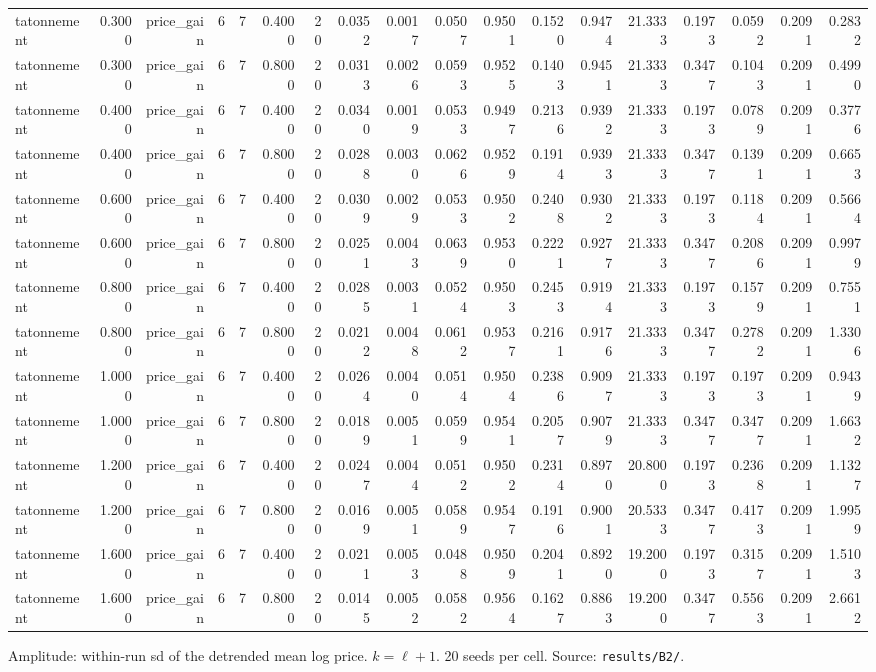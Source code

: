 \begin{table}[htbp]
\begin{tabular}{lrrrrrrrrrrrrrrrrr}
tatonnement & 0.3000 & price\_gain & 6 & 7 & 0.4000 & 20 & 0.0352 & 0.0017 & 0.0507 & 0.9501 & 0.1520 & 0.9474 & 21.3333 & 0.1973 & 0.0592 & 0.2091 & 0.2832 \\
tatonnement & 0.3000 & price\_gain & 6 & 7 & 0.8000 & 20 & 0.0313 & 0.0026 & 0.0593 & 0.9525 & 0.1403 & 0.9451 & 21.3333 & 0.3477 & 0.1043 & 0.2091 & 0.4990 \\
tatonnement & 0.4000 & price\_gain & 6 & 7 & 0.4000 & 20 & 0.0340 & 0.0019 & 0.0533 & 0.9497 & 0.2136 & 0.9392 & 21.3333 & 0.1973 & 0.0789 & 0.2091 & 0.3776 \\
tatonnement & 0.4000 & price\_gain & 6 & 7 & 0.8000 & 20 & 0.0288 & 0.0030 & 0.0626 & 0.9529 & 0.1914 & 0.9393 & 21.3333 & 0.3477 & 0.1391 & 0.2091 & 0.6653 \\
tatonnement & 0.6000 & price\_gain & 6 & 7 & 0.4000 & 20 & 0.0309 & 0.0029 & 0.0533 & 0.9502 & 0.2408 & 0.9302 & 21.3333 & 0.1973 & 0.1184 & 0.2091 & 0.5664 \\
tatonnement & 0.6000 & price\_gain & 6 & 7 & 0.8000 & 20 & 0.0251 & 0.0043 & 0.0639 & 0.9530 & 0.2221 & 0.9277 & 21.3333 & 0.3477 & 0.2086 & 0.2091 & 0.9979 \\
tatonnement & 0.8000 & price\_gain & 6 & 7 & 0.4000 & 20 & 0.0285 & 0.0031 & 0.0524 & 0.9503 & 0.2453 & 0.9194 & 21.3333 & 0.1973 & 0.1579 & 0.2091 & 0.7551 \\
tatonnement & 0.8000 & price\_gain & 6 & 7 & 0.8000 & 20 & 0.0212 & 0.0048 & 0.0612 & 0.9537 & 0.2161 & 0.9176 & 21.3333 & 0.3477 & 0.2782 & 0.2091 & 1.3306 \\
tatonnement & 1.0000 & price\_gain & 6 & 7 & 0.4000 & 20 & 0.0264 & 0.0040 & 0.0514 & 0.9504 & 0.2386 & 0.9097 & 21.3333 & 0.1973 & 0.1973 & 0.2091 & 0.9439 \\
tatonnement & 1.0000 & price\_gain & 6 & 7 & 0.8000 & 20 & 0.0189 & 0.0051 & 0.0599 & 0.9541 & 0.2057 & 0.9079 & 21.3333 & 0.3477 & 0.3477 & 0.2091 & 1.6632 \\
tatonnement & 1.2000 & price\_gain & 6 & 7 & 0.4000 & 20 & 0.0247 & 0.0044 & 0.0512 & 0.9502 & 0.2314 & 0.8970 & 20.8000 & 0.1973 & 0.2368 & 0.2091 & 1.1327 \\
tatonnement & 1.2000 & price\_gain & 6 & 7 & 0.8000 & 20 & 0.0169 & 0.0051 & 0.0589 & 0.9547 & 0.1916 & 0.9001 & 20.5333 & 0.3477 & 0.4173 & 0.2091 & 1.9959 \\
tatonnement & 1.6000 & price\_gain & 6 & 7 & 0.4000 & 20 & 0.0211 & 0.0053 & 0.0488 & 0.9509 & 0.2041 & 0.8920 & 19.2000 & 0.1973 & 0.3157 & 0.2091 & 1.5103 \\
tatonnement & 1.6000 & price\_gain & 6 & 7 & 0.8000 & 20 & 0.0145 & 0.0052 & 0.0582 & 0.9564 & 0.1627 & 0.8863 & 19.2000 & 0.3477 & 0.5563 & 0.2091 & 2.6612 \\
\bottomrule
\end{tabular}
\par\smallskip
\begin{minipage}{\linewidth}\footnotesize Amplitude: within-run sd of the detrended mean log price. $k=\ell+1$. 20 seeds per cell. Source: \texttt{results/B2/}.\end{minipage}
\end{table}
